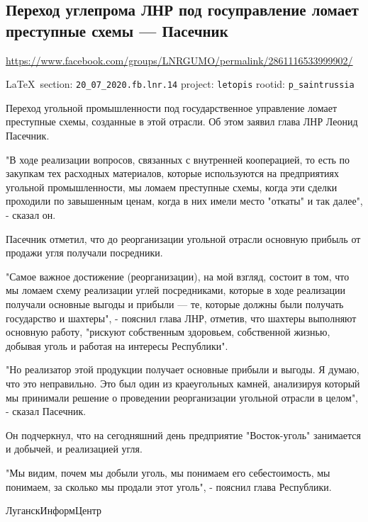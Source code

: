  
 
  
  
\subsection{Переход углепрома ЛНР под госуправление ломает преступные схемы --- Пасечник}
\url{https://www.facebook.com/groups/LNRGUMO/permalink/2861116533999902/}

\vspace{0.5cm}
{\small\LaTeX~section: \verb|20_07_2020.fb.lnr.14| project: \verb|letopis| rootid: \verb|p_saintrussia|}
\vspace{0.5cm}

Переход угольной промышленности под государственное управление ломает
преступные схемы, созданные в этой отрасли. Об этом заявил глава ЛНР Леонид
Пасечник.

"В ходе реализации вопросов, связанных с внутренней кооперацией, то есть по
закупкам тех расходных материалов, которые используются на предприятиях
угольной промышленности, мы ломаем преступные схемы, когда эти сделки проходили
по завышенным ценам, когда в них имели место "откаты" и так далее", - сказал
он.

Пасечник отметил, что до реорганизации угольной отрасли основную прибыль от
продажи угля получали посредники.

"Самое важное достижение (реорганизации), на мой взгляд, состоит в том, что мы
ломаем схему реализации углей посредниками, которые в ходе реализации получали
основные выгоды и прибыли --- те, которые должны были получать государство и
шахтеры", - пояснил глава ЛНР, отметив, что шахтеры выполняют основную работу,
"рискуют собственным здоровьем, собственной жизнью, добывая уголь и работая на
интересы Республики".

"Но реализатор этой продукции получает основные прибыли и выгоды. Я думаю, что
это неправильно. Это был один из краеугольных камней, анализируя который мы
принимали решение о проведении реорганизации угольной отрасли в целом", -
сказал Пасечник.

Он подчеркнул, что на сегодняшний день предприятие "Восток-уголь" занимается и
добычей, и реализацией угля.

"Мы видим, почем мы добыли уголь, мы понимаем его себестоимость, мы понимаем,
за сколько мы продали этот уголь", - пояснил глава Республики.

ЛуганскИнформЦентр
